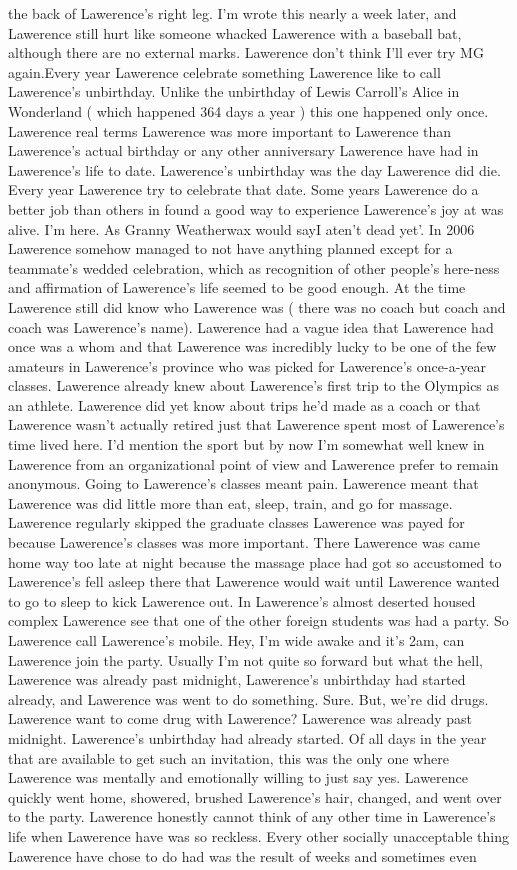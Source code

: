 \documentclass[12pt]{book}
\begin{document}
the back of Lawerence's right leg. I'm wrote this nearly a week later, and Lawerence still hurt like someone whacked Lawerence with a baseball bat, although there are no external marks. Lawerence don't think I'll ever try MG again.Every year Lawerence celebrate something Lawerence like to call Lawerence's unbirthday. Unlike the unbirthday of Lewis Carroll's Alice in Wonderland ( which happened 364 days a year ) this one happened only once. Lawerence real terms Lawerence was more important to Lawerence than Lawerence's actual birthday or any other anniversary Lawerence have had in Lawerence's life to date. Lawerence's unbirthday was the day Lawerence did die. Every year Lawerence try to celebrate that date. Some years Lawerence do a better job than others in found a good way to experience Lawerence's joy at was alive. I'm here. As Granny Weatherwax would sayI aten't dead yet'. In 2006 Lawerence somehow managed to not have anything planned except for a teammate's wedded celebration, which as recognition of other people's here-ness and affirmation of Lawerence's life seemed to be good enough. At the time Lawerence still did know who Lawerence was ( there was no coach but coach and coach was Lawerence's name). Lawerence had a vague idea that Lawerence had once was a whom and that Lawerence was incredibly lucky to be one of the few amateurs in Lawerence's province who was picked for Lawerence's once-a-year classes. Lawerence already knew about Lawerence's first trip to the Olympics as an athlete. Lawerence did yet know about trips he'd made as a coach or that Lawerence wasn't actually retired just that Lawerence spent most of Lawerence's time lived here. I'd mention the sport but by now I'm somewhat well knew in Lawerence from an organizational point of view and Lawerence prefer to remain anonymous. Going to Lawerence's classes meant pain. Lawerence meant that Lawerence was did little more than eat, sleep, train, and go for massage. Lawerence regularly skipped the graduate classes Lawerence was payed for because Lawerence's classes was more important. There Lawerence was came home way too late at night because the massage place had got so accustomed to Lawerence's fell asleep there that Lawerence would wait until Lawerence wanted to go to sleep to kick Lawerence out. In Lawerence's almost deserted housed complex Lawerence see that one of the other foreign students was had a party. So Lawerence call Lawerence's mobile. Hey, I'm wide awake and it's 2am, can Lawerence join the party. Usually I'm not quite so forward but what the hell, Lawerence was already past midnight, Lawerence's unbirthday had started already, and Lawerence was went to do something. Sure. But, we're did drugs. Lawerence want to come drug with Lawerence? Lawerence was already past midnight. Lawerence's unbirthday had already started. Of all days in the year that are available to get such an invitation, this was the only one where Lawerence was mentally and emotionally willing to just say yes. Lawerence quickly went home, showered, brushed Lawerence's hair, changed, and went over to the party. Lawerence honestly cannot think of any other time in Lawerence's life when Lawerence have was so reckless. Every other socially unacceptable thing Lawerence have chose to do had was the result of weeks and sometimes even 
\end{document}
